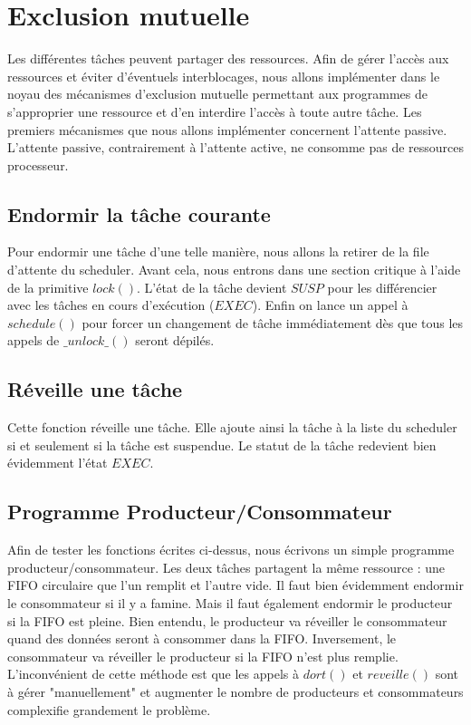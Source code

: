 \section{Exclusion mutuelle}
Les différentes tâches peuvent partager des ressources. Afin de gérer l'accès aux ressources et éviter d'éventuels interblocages, nous allons implémenter dans le noyau des mécanismes d'exclusion mutuelle permettant aux programmes de s'approprier une ressource et d'en interdire l'accès à toute autre tâche.
Les premiers mécanismes que nous allons implémenter concernent l'attente passive. L'attente passive, contrairement à l'attente active, ne consomme pas de ressources processeur.

\subsection{Endormir la tâche courante}
Pour endormir une tâche d'une telle manière, nous allons la retirer de la file d'attente du scheduler. Avant cela, nous entrons dans une section critique à l'aide de la primitive $lock()$. L'état de la tâche devient $SUSP$ pour les différencier avec les tâches en cours d'exécution ($EXEC$). Enfin on lance un appel à $schedule()$ pour forcer un changement de tâche immédiatement dès que tous les appels de $\_unlock\_()$ seront dépilés.


\subsection{Réveille une tâche}
Cette fonction réveille une tâche. Elle ajoute ainsi la tâche à la liste du scheduler si et seulement si la tâche est suspendue. Le statut de la tâche redevient bien évidemment l'état $EXEC$.


\subsection{Programme Producteur/Consommateur}
Afin de tester les fonctions écrites ci-dessus, nous écrivons un simple programme producteur/consommateur. Les deux tâches partagent la même ressource : une FIFO circulaire que l'un remplit et l'autre vide.
Il faut bien évidemment endormir le consommateur si il y a famine. Mais il faut également endormir le producteur si la FIFO est pleine.
Bien entendu, le producteur va réveiller le consommateur quand des données seront à consommer dans la FIFO. Inversement, le consommateur va réveiller le producteur si la FIFO n'est plus remplie.
L'inconvénient de cette méthode est que les appels à $dort()$ et $reveille()$ sont à gérer "manuellement" et augmenter le nombre de producteurs et consommateurs complexifie grandement le problème.

